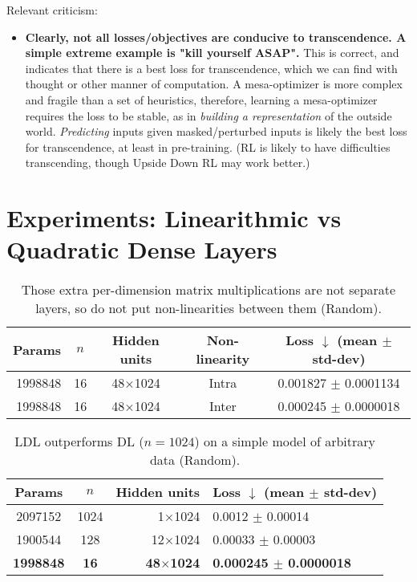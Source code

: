 \documentclass{article}
\begin{document}
Relevant criticism:

\begin{itemize}
\item \textbf{Clearly, not all losses/objectives are conducive to transcendence. A simple extreme example is "kill yourself ASAP".} This is correct, and indicates that there is a best loss for transcendence, which we can find with thought or other manner of computation. A mesa-optimizer is more complex and fragile than a set of heuristics, therefore, learning a mesa-optimizer requires the loss to be stable, as in \textit{building a representation} of the outside world. \textit{Predicting} inputs given masked/perturbed inputs is likely the best loss for transcendence, at least in pre-training. (RL is likely to have difficulties transcending, though Upside Down RL \cite{schmidhuber2020reinforcement} may work better.)
\end{itemize}

\section{Experiments: Linearithmic vs Quadratic Dense Layers}

\begin{table}
\begin{center}
\begin{tabular}{rcccc}
\hline
Params & $n$ & Hidden units & Non-linearity & Loss $\downarrow$ (mean $\pm$ std-dev) \\
\hline
1998848 & 16 & 48$\times$1024 & Intra & 0.001827 $\pm$ 0.0001134 \\
1998848 & 16 & 48$\times$1024 & Inter & 0.000245 $\pm$ 0.0000018 \\
\hline
\end{tabular}
\end{center}
\caption{Those extra per-dimension matrix multiplications are not separate layers, so do not put non-linearities between them (Random).}
\label{LDLintraVSinter}
\end{table}

\begin{table}
\begin{center}
\begin{tabular}{ccrl}
\hline
Params & $n$ & Hidden units & Loss $\downarrow$ (mean $\pm$ std-dev) \\
\hline
2097152 & 1024 & 1$\times$1024 & 0.0012 $\pm$ 0.00014 \\
1900544 & 128 & 12$\times$1024 & 0.00033 $\pm$ 0.00003 \\
\textbf{1998848} & \textbf{16} & \textbf{48$\times$1024} & \textbf{0.000245 $\pm$ 0.0000018} \\
\hline
\end{tabular}
\end{center}
\caption{LDL outperforms DL ($n=1024$) on a simple model of arbitrary data (Random).}
\label{randomLDLvsDL}
\end{table}
\end{document}
